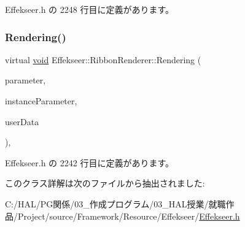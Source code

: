  Effekseer.\+h の 2248 行目に定義があります。

\mbox{\label{class_effekseer_1_1_ribbon_renderer_a3d1991348eeba97aa02c8082455edd39}} 
\subsubsection{\texorpdfstring{Rendering()}{Rendering()}}
{\footnotesize\ttfamily virtual \mbox{\hyperlink{namespace_effekseer_ab34c4088e512200cf4c2716f168deb56}{void}} Effekseer\+::\+Ribbon\+Renderer\+::\+Rendering (\begin{DoxyParamCaption}\item[{const \mbox{\hyperlink{struct_effekseer_1_1_ribbon_renderer_1_1_node_parameter}{Node\+Parameter}} \&}]{parameter,  }\item[{const \mbox{\hyperlink{struct_effekseer_1_1_ribbon_renderer_1_1_instance_parameter}{Instance\+Parameter}} \&}]{instance\+Parameter,  }\item[{\mbox{\hyperlink{namespace_effekseer_ab34c4088e512200cf4c2716f168deb56}{void}} $\ast$}]{user\+Data }\end{DoxyParamCaption})\hspace{0.3cm}{\ttfamily [inline]}, {\ttfamily [virtual]}}



 Effekseer.\+h の 2242 行目に定義があります。



このクラス詳解は次のファイルから抽出されました\+:\begin{DoxyCompactItemize}
\item 
C\+:/\+H\+A\+L/\+P\+G関係/03\+\_\+作成プログラム/03\+\_\+\+H\+A\+L授業/就職作品/\+Project/source/\+Framework/\+Resource/\+Effekseer/\mbox{\hyperlink{_effekseer_8h}{Effekseer.\+h}}\end{DoxyCompactItemize}
